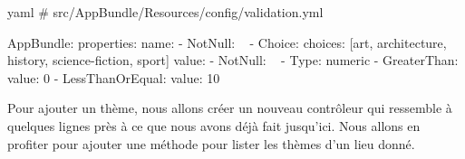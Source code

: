 \documentclass[big]{zmdocument}
\begin{document}
\begin{CodeBlock}{yaml}
# src/AppBundle/Resources/config/validation.yml

AppBundle\Entity\Theme:
    properties:
        name:
            - NotNull: ~
            - Choice:
                choices: [art, architecture, history, science-fiction, sport]
        value:
            - NotNull: ~
            - Type: numeric
            - GreaterThan:
                value: 0
            - LessThanOrEqual:
                value: 10
\end{CodeBlock}



Pour ajouter un thème, nous allons créer un nouveau contrôleur qui ressemble à quelques lignes près à ce que nous avons déjà fait jusqu'ici.
Nous allons en profiter pour ajouter une méthode pour lister les thèmes d'un lieu donné.
\end{document}
